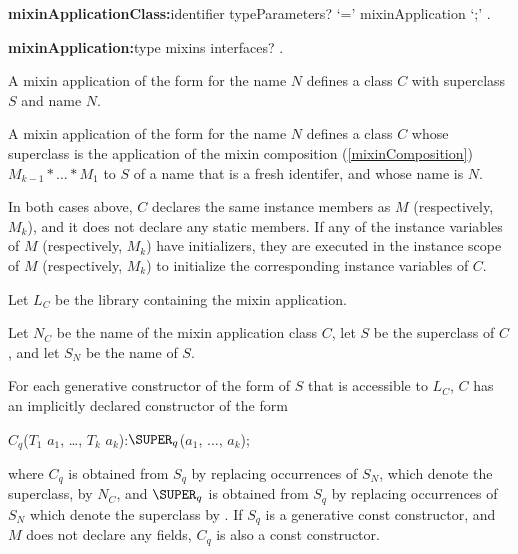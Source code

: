 \documentclass{article}
\begin{document}
\begin{grammar}
{\bf mixinApplicationClass:}identifier typeParameters? `=' mixinApplication `{\escapegrammar ;}'
  .

{\bf mixinApplication:}type mixins interfaces?
  .
\end{grammar}

\LMHash{}
A mixin application of the form  for the name $N$ defines a class $C$ with superclass $S$ and name $N$.

\LMHash{}
A mixin application of the form  for the name $N$ defines a class $C$ whose superclass is the application of the mixin composition (\ref{mixinComposition}) $M_{k-1} * \ldots * M_1$ to $S$ of a name that is a fresh identifer, and whose name is $N$.

\LMHash{}
In both cases above, $C$ declares the same instance members as $M$ (respectively, $M_k$),
and it does not declare any static members.
If any of the instance variables of $M$ (respectively, $M_k$) have initializers,
they are executed in the instance scope of $M$ (respectively, $M_k$)
to initialize the corresponding instance variables of $C$.

\LMHash{}
Let $L_C$ be the library containing the mixin application.

Let $N_C$ be the name of the mixin application class $C$,
let $S$ be the superclass of $C$, and let $S_N$ be the name of $S$.

For each generative constructor of the form  of $S$ that is accessible to $L_C$, $C$ has an implicitly declared constructor of the form
\begin{dartCode}
$C_q$($T_{1}$ $a_{1}$, \ldots, $T_{k}$ $a_{k}$):$\SUPER_q$($a_{1}$, $\ldots$, $a_{k}$);
\end{dartCode}

\noindent
where $C_q$ is obtained from $S_q$ by replacing occurrences of $S_N$,
which denote the superclass, by $N_C$, and $\SUPER_q$ is obtained from $S_q$ by
replacing occurrences of $S_N$ which denote the superclass by \SUPER{}.
If $S_q$ is a generative const constructor, and $M$ does not declare any
fields, $C_q$ is also a const constructor.
\end{document}
